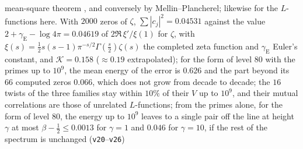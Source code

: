 \begin{proposition}
{mean-square theorem \cite[\S13.1]{montgomeryvaughan07}, and conversely by Mellin--Plancherel;
likewise for the $L$-functions here.  With $2000$
zeros of $\zeta$, $\sum|c_j|^2=0.04531$ against the value $2+\gamma_{\mathrm E}-\log4\pi=0.04619$ of
$2\Re\,\xi'/\xi(1)$ for $\zeta$, with $\xi(s)=\tfrac12s(s-1)\pi^{-s/2}\Gamma(\tfrac s2)\zeta(s)$ the completed zeta function and $\gamma_{\mathrm E}$ Euler's constant, and $\mathcal K=0.158$ ($\approx0.19$ extrapolated); for the form of level $80$ with the primes up to $10^9$, the mean energy of the
error is $0.626$ and the part beyond its $66$ computed zeros $0.066$, which does not grow from
decade to decade; the $16$ twists of the three families stay within $10\%$ of their $V$ up to
$10^9$, and their mutual correlations are those of unrelated $L$-functions; from the primes alone, for
the form of level $80$, the energy up to $10^9$ leaves to a single pair off the line at height
$\gamma$ at most $\beta-\tfrac12\leq0.0013$ for $\gamma=1$ and $0.046$ for $\gamma=10$, if the rest of
the spectrum is unchanged (\texttt{v20}--\texttt{v26}) \par}
\end{proposition}

